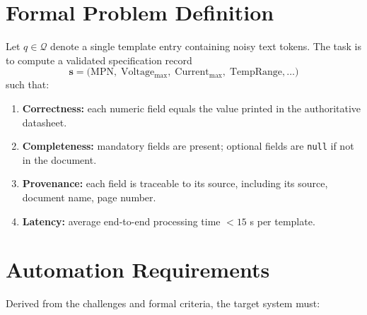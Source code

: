 \section{Formal Problem Definition}
Let $q \in \mathcal{Q}$ denote a single template entry containing noisy text tokens.  
The task is to compute a validated specification record  
\[
\mathbf{s} = \bigl(\mathrm{MPN},\; \mathrm{Voltage_{max}},\; \mathrm{Current_{max}},\; \mathrm{TempRange},\dots\bigr)
\]  
such that:

\begin{enumerate}
  \item \textbf{Correctness:} each numeric field equals the value printed in the authoritative datasheet.
  \item \textbf{Completeness:} mandatory fields are present; optional fields are \texttt{null} if not in the document.  
  \item \textbf{Provenance:} each field is traceable to its source, including its source, document name, page number.
  \item \textbf{Latency:} average end-to-end processing time $<15$ s per template.  
\end{enumerate}

\section{Automation Requirements}
Derived from the challenges and formal criteria, the target system must:

